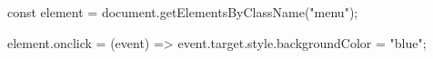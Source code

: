const element = document.getElementsByClassName("menu");

element.onclick = (event) => {
    event.target.style.backgroundColor = "blue";
}

